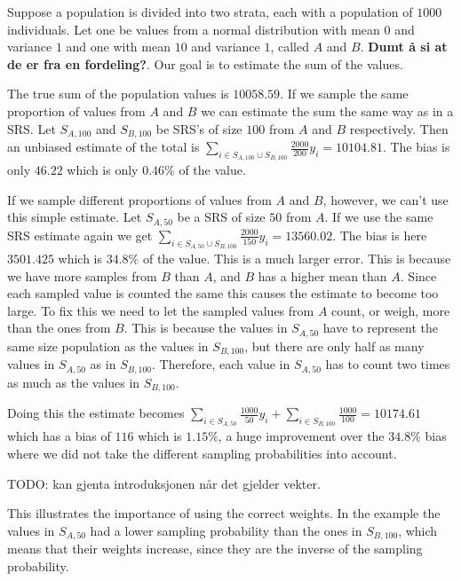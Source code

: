 \documentclass{article}
\begin{document}
\begin{example}
  Suppose a population is divided into two strata, each with a population of
  \(1000\) individuals. Let one be values from a normal distribution with mean
  \(0\) and variance \(1\) and one with mean \(10\) and variance \(1\), called
  \(A\) and \(B\).
  \textbf{Dumt å si at de er fra en fordeling?}.
  Our goal is to estimate the sum of the values.

  The true sum of the population values is \(10058.59\). If we sample the same
  proportion of values from \(A\) and \(B\) we can estimate the sum the same way
  as in a SRS. Let \(S_{A, 100}\) and
  \(S_{B, 100}\) be SRS's of size \(100\) from \(A\) and \(B\) respectively.
  Then an unbiased estimate of the total is \(\sum_{i \in S_{A, 100} \cup S_{B,
      100} } \frac{2000}{200} y_i = 10104.81\). The bias is only \(46.22\) which is only \(0.46\%\) of the
  value.

  If we sample different proportions of values from \(A\) and \(B\), however, we
  can't use this simple estimate. Let \(S_{A, 50}\) be a SRS of size \(50\)
  from \(A\). If we use the same SRS estimate again we get \(\sum_{i \in S_{A, 50} \cup S_{B,
      100}} \frac{2000}{150} y_i = 13560.02\). The bias is here \(3501.425\) which is \(34.8\%\) of the
  value. This is a much larger error. This is because we have more samples from
  \(B\) than \(A\), and \(B\) has a higher mean than \(A\). Since each sampled
  value is counted the same this causes the estimate to become too large. To fix
  this we need to let the sampled values from \(A\) count, or weigh, more than
  the ones from \(B\). This is because the values in \(S_{A, 50}\) have to
  represent the same size population as the values in \(S_{B, 100}\), but there
  are only half as many values in \(S_{A, 50}\) as in \(S_{B, 100}\). Therefore,
  each value in \(S_{A, 50}\) has to count two times as much as the values in \(S_{B, 100}\).

  Doing this the estimate becomes \(\sum_{i
    \in S_{A, 50}} \frac{1000}{50} y_i + \sum_{i \in S_{B, 100}}
  \frac{1000}{100} = 10174.61\) which has a bias of \(116\) which is \(1.15\%\),
  a huge improvement over the \(34.8\%\) bias where we did not take the
  different sampling probabilities into account.
\end{example}

TODO: kan gjenta introduksjonen når det gjelder vekter.

This illustrates the importance of using the correct weights. In the example the
values in \(S_{A, 50}\) had a lower sampling probability than the ones in
\(S_{B, 100}\), which means that their weights increase, since they are the
inverse of the sampling probability.
\end{document}
